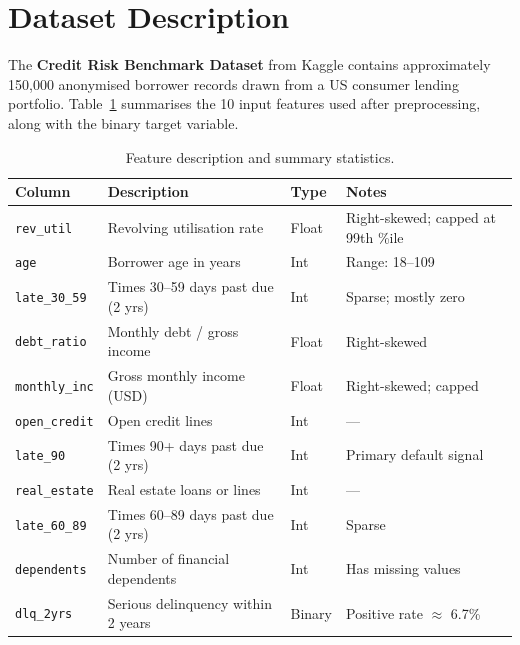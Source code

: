 \documentclass[11pt,a4paper]{article}
\begin{document}
\section{Dataset Description}
\label{sec:dataset}

The \textbf{Credit Risk Benchmark Dataset} \cite{kaggle2024} from Kaggle contains
approximately 150,000 anonymised borrower records drawn from a US consumer lending
portfolio. Table~\ref{tab:features} summarises the 10 input features used after
preprocessing, along with the binary target variable.

\begin{table}[htbp]
\centering
\caption{Feature description and summary statistics.}
\label{tab:features}
\begin{tabular}{llll}
\toprule
\textbf{Column} & \textbf{Description} & \textbf{Type} & \textbf{Notes} \\
\midrule
\texttt{rev\_util}    & Revolving utilisation rate          & Float & Right-skewed; capped at 99th \%ile \\
\texttt{age}          & Borrower age in years               & Int   & Range: 18–109 \\
\texttt{late\_30\_59} & Times 30–59 days past due (2 yrs)  & Int   & Sparse; mostly zero \\
\texttt{debt\_ratio}  & Monthly debt / gross income         & Float & Right-skewed \\
\texttt{monthly\_inc} & Gross monthly income (USD)          & Float & Right-skewed; capped \\
\texttt{open\_credit} & Open credit lines                   & Int   & --- \\
\texttt{late\_90}     & Times 90+ days past due (2 yrs)    & Int   & Primary default signal \\
\texttt{real\_estate} & Real estate loans or lines          & Int   & --- \\
\texttt{late\_60\_89} & Times 60–89 days past due (2 yrs)  & Int   & Sparse \\
\texttt{dependents}   & Number of financial dependents      & Int   & Has missing values \\
\midrule
\texttt{dlq\_2yrs}   & Serious delinquency within 2 years & Binary & Positive rate $\approx$ 6.7\% \\
\bottomrule
\end{tabular}
\end{table}
\end{document}
